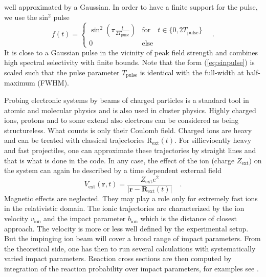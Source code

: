 \documentclass[final,1p]{elsarticle}
\begin{document}
well approximated by a Gaussian.  In order to have a finite support
for the pulse, we use the sin$^2$ pulse
\begin{equation}
  f(t)
  =
  \left\{\begin{array}{ll}
    \sin^2{\left(\pi\frac{t}{2T_\mathrm{pulse}}\right)}
        &\mbox{for}\quad t\in\{0,2T_\mathrm{pulse}\}  \\
    0  &\mbox{else}
  \end{array}\right.
  \quad.
\label{eq:sinpulse}
\end{equation}
It is close to a Gaussian pulse in the vicinity of peak field strength
and combines high spectral selectivity with finite bounds. Note that
the form (\ref{eq:sinpulse}) is scaled such that the pulse parameter
$T_\mathrm{pulse}$ is identical with the {full-width at
half-maximum} ({FWHM}).



Probing electronic systems by beams of charged particles is a standard
tool in atomic and molecular physics \cite{Bra92} and is also used in
cluster physics. Highly charged ions, protons and to some extend also
electrons can be considered as being structureless. What counts is
only their Coulomb field.  Charged ions are heavy and can be treated
with classical trajectories
%
$\mathrm{R}_\mathrm{ext}(t)$.
%
For sifficvioently heavy and fast projectiles, one can approximate
these trajectories by straight lines and that is what is done in the
code.  In any case, the effect of the ion (charge $Z_\mathrm{ext}$) on
the system can again be described by a time dependent external field
\begin{equation}
  V_\mathrm{ext}(\mathbf{r},t)
  =
  \frac{Z_\mathrm{ext}e^2}{|\mathbf{r}-\mathbf{R}_\mathrm{ext}(t)|}
  \quad.
\label{eq:ionext}
\end{equation}
Magnetic effects are neglected. They may play a role only for extremely
fast ions in the relativistic domain.
%
The ionic trajectories are characterized by the ion velocity
$v_\mathrm{ion}$ and the impact parameter $b_\mathrm{ion}$ which is
the distance of closest approach. The velocity is more or less well
defined by the experimental setup. But the impinging ion beam will
cover a broad range of impact parameters. From the theoretical side,
one has then to run several calculations with systematically varied
impact parameters.  Reaction cross sections are then computed by
integration of the reaction probability over impact parameters, for
examples see \cite{Rei98a}.
\end{document}
